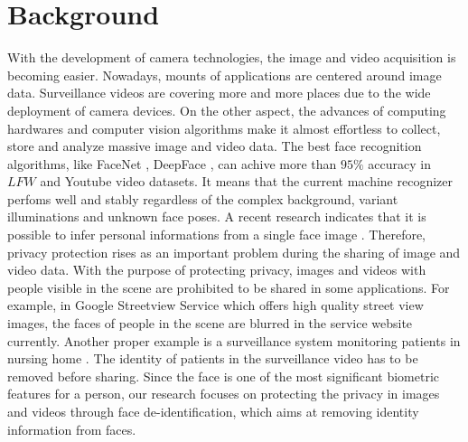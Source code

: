 \section{Background}
\label{sec:bg}
With the development of camera technologies, the image and video acquisition
is becoming easier. Nowadays, mounts of applications are centered around image
data. Surveillance videos are covering more and more places due to the wide 
deployment of camera devices. On the other aspect, the advances of computing
hardwares and computer vision algorithms make it almost effortless to collect, 
store and analyze massive image and video data. The best face recognition 
algorithms, like FaceNet \cite{facenet15}, DeepFace \cite{deepface14}, can 
achive more than $95\%$ accuracy in $LFW$ and Youtube video datasets. It
means that the current machine recognizer perfoms well and stably regardless
of the complex background, variant illuminations and unknown face poses. A
recent research indicates that it is possible to infer personal informations 
from a single face image \cite{FRandNetwork14}. Therefore, privacy protection
rises as an important problem during the sharing of image and video data. 
With the purpose of protecting privacy, images and videos with people visible 
in the scene are prohibited to be shared in some applications. For example,
in Google Streetview Service which offers high quality street view images,
the faces of people in the scene are blurred in the service website currently.
Another proper example is a surveillance system monitoring patients in nursing 
home \cite{nursing06}. The identity of patients in the surveillance video has 
to be removed before sharing. Since the face is one of the most significant 
biometric features for a person, our research focuses on protecting the privacy 
in images and videos through face de-identification, which aims at removing
identity information from faces.

